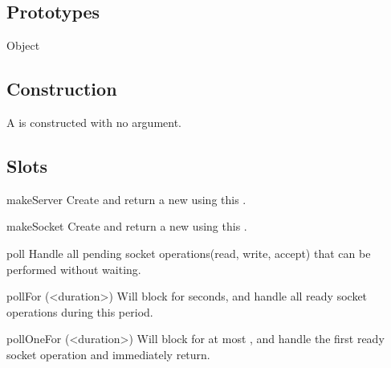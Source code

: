 \subsection{Prototypes}
\begin{refObjects}
\item[Object]
\end{refObjects}

\subsection{Construction}

A  is constructed with no argument.

\subsection{Slots}

\begin{urbiscriptapi}
\item[makeServer]
  Create and return a new  using this .


\item[makeSocket]
  Create and return a new  using this .


\item[poll]
  Handle all pending socket operations(read, write, accept) that can be
  performed without waiting.


\item[pollFor](<duration>)%
  Will block for  seconds, and handle all ready socket operations
  during this period.


\item[pollOneFor](<duration>)%
  Will block for at most , and handle the first ready socket
  operation and immediately return.
\end{urbiscriptapi}

